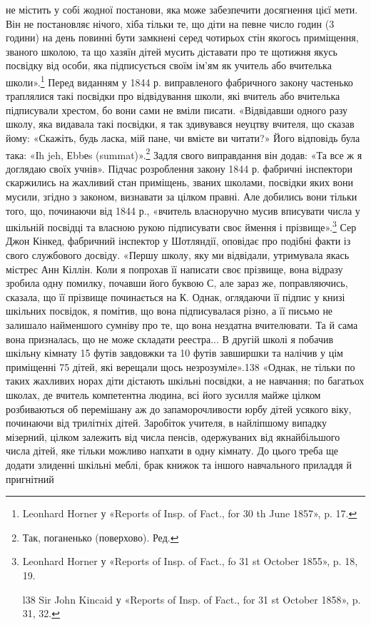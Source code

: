 не містить у собі жодної постанови, яка може забезпечити досягнення
цієї мети. Він не постановляє нічого, хіба тільки те, що
діти на певне число годин (3 години) на день повинні бути замкнені
серед чотирьох стін якогось приміщення, званого школою, та
що хазяїн дітей мусить діставати про те щотижня якусь посвідку
від особи, яка підписується своїм ім’ям як учитель або вчителька
школи».\footnote{
Leonhard Horner у «Reports of Insp. of Fact., for 30 th June 1857»,
p. 17.
} Перед виданням у 1844 р. виправленого фабричного
закону частенько траплялися такі посвідки про відвідування
школи, які вчитель або вчителька підписували хрестом, бо вони
сами не вміли писати. «Відвідавши одного разу школу, яка видавала
такі посвідки, я так здивувався неуцтву вчителя, що сказав
йому: «Скажіть, будь ласка, мій пане, чи вмієте ви читати?»
Його відповідь була така: «Іh jeh, Еbbеs (summat)».\footnote*{
Так, поганенько (поверхово). Ред.
} Задля свого
виправдання він додав: «Та все ж я доглядаю своїх учнів». Підчас
розроблення закону 1844 р. фабричні інспектори скаржились
на жахливий стан приміщень, званих школами, посвідки яких
вони мусили, згідно з законом, визнавати за цілком правні. Але
добились вони тільки того, що, починаючи від 1844 р., «вчитель
власноручно мусив вписувати числа у шкільній посвідці та власною
рукою підписувати своє ймення і прізвище».\footnote{
Leonhard Horner у «Reports of Insp. of Fact., fo 31 st October
1855», p. 18, 19.

l38 Sir John Kincaid у «Reports of Insp. of Fact., for 31 st October
1858», p. 31, 32.
} Сер Джон
Кінкед, фабричний інспектор у Шотляндії, оповідає про подібні
факти із свого службового досвіду. «Першу школу, яку ми відвідали,
утримувала якась містрес Анн Кіллін. Коли я попрохав її
написати своє прізвище, вона відразу зробила одну помилку,
почавши його буквою С, але зараз же, поправляючись, сказала,
що її прізвище починається на К. Однак, оглядаючи її підпис у
книзі шкільних посвідок, я помітив, що вона підписувалася різно,
а її письмо не залишало найменшого сумніву про те, що вона
нездатна вчителювати. Та й сама вона призналась, що не може
складати реестра... В другій школі я побачив шкільну кімнату
15 футів завдовжки та 10 футів завширшки та налічив у цім приміщенні
75 дітей, які верещали щось незрозуміле».138 «Однак,
не тільки по таких жахливих норах діти дістають шкільні посвідки,
а не навчання; по багатьох школах, де вчитель компетентна
людина, всі його зусилля майже цілком розбиваються об
перемішану аж до запаморочливости юрбу дітей усякого віку,
починаючи від трилітніх дітей. Заробіток учителя, в найліпшому
випадку мізерний, цілком залежить від числа пенсів, одержуваних
від якнайбільшого числа дітей, яке тільки можливо напхати в
одну кімнату. До цього треба ще додати злиденні шкільні меблі,
брак книжок та іншого навчального приладдя й пригнітний